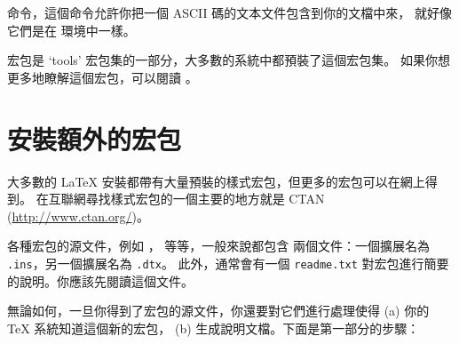 \noindent
命令，這個命令允許你把一個 ASCII 碼的文本文件包含到你的文檔中來，
就好像它們是在  環境中一樣。


 宏包是 `tools' 宏包集的一部分，大多數的系統中都預裝了這個宏包集。
如果你想更多地瞭解這個宏包，可以閱讀 \cite{verbatim}。

\section{安裝額外的宏包}\label{sec:Packages}


大多數的 \LaTeX{} 安裝都帶有大量預裝的樣式宏包，但更多的宏包可以在網上得到。
在互聯網尋找樣式宏包的一個主要的地方就是 CTAN
(\url{http://www.ctan.org/})。


各種宏包的源文件，例如 ，  等等，一般來說都包含
兩個文件：一個擴展名為 \texttt{.ins}，另一個擴展名為 \texttt{.dtx}。
此外，通常會有一個 \texttt{readme.txt} 對宏包進行簡要的說明。你應該先閱讀這個文件。


無論如何，一旦你得到了宏包的源文件，你還要對它們進行處理使得 (a) 你的 \TeX{} 系統知道這個新的宏包， (b) 生成說明文檔。下面是第一部分的步驟：


